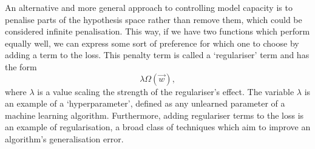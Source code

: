 An alternative and more general approach to controlling model capacity is to penalise parts of the hypothesis space rather than remove them, which could be considered infinite penalisation. This way, if we have two functions which perform equally well, we can express some sort of preference for which one to choose by adding a term to the loss. This penalty term is called a `regulariser' term \cite{DeepLearningBook} and has the form
\begin{equation}
    \lambda\Omega(\vec{w}),
\end{equation}
where $\lambda$ is a value scaling the strength of the regulariser's effect. The variable $\lambda$ is an example of a `hyperparameter', defined as any unlearned parameter of a machine learning algorithm. Furthermore, adding regulariser terms to the loss is an example of regularisation, a broad class of techniques which aim to improve an algorithm's generalisation error. 


